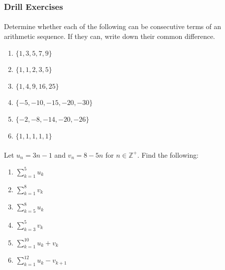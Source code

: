 \documentclass[12pt, a4paper, titlepage, twoside]{article}
\newcommand*{\Z}{\mathbb{Z}}
\begin{document}
	\hfill
	
	\subsubsection*{Drill Exercises}
	
	\paragraph{}
	 Determine whether each of the following can be consecutive terms of an arithmetic sequence. If they can,
	write down their common difference.
	
	\begin{multicols}{2}
		\begin{enumerate}[label=\textbf{(\alph*)}]
			\item $\{1, 3, 5, 7, 9\}$
			\item $\{1, 1, 2, 3, 5\}$
			\item $\{1, 4, 9, 16, 25\}$
			\item $\{-5, -10, -15, -20, -30\}$
			\item $\{-2, -8, -14, -20, -26\}$
			\item $\{1,1,1,1,1\}$
		\end{enumerate}
	\end{multicols}
	
	\paragraph{}
	 Let $u_n = 3n - 1$ and $v_n = 8 - 5n$ for $n \in \Z^+$. 
	Find the following:
	
	\begin{multicols}{2}
		\begin{enumerate}[label=\textbf{(\alph*)}]
			\item $\displaystyle \sum_{k=1}^5 u_k$
			\item $\displaystyle \sum_{k=1}^8 v_k$
			\item $\displaystyle \sum_{k=5}^8 u_k$
			\item $\displaystyle \sum_{k=3}^5 v_k$
			\item $\displaystyle \sum_{k=1}^{10} u_k + v_k$
			\item $\displaystyle \sum_{k=1}^{12} u_k - v_{k+1}$
		\end{enumerate}
	\end{multicols}
	
	\hfill
	
\end{document}
